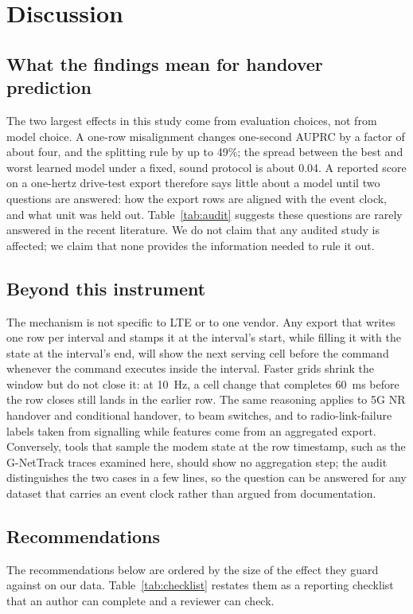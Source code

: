 \documentclass[preprint,review,12pt]{elsarticle}\usepackage{lineno}\linenumbers
\begin{document}
\section{Discussion}
\label{sec:discussion}

\subsection{What the findings mean for handover prediction}
The two largest effects in this study come from evaluation choices, not from model choice. A one-row misalignment changes one-second AUPRC by a factor of about four, and the splitting rule by up to 49\%; the spread between the best and worst learned model under a fixed, sound protocol is about 0.04. A reported score on a one-hertz drive-test export therefore says little about a model until two questions are answered: how the export rows are aligned with the event clock, and what unit was held out. Table~\ref{tab:audit} suggests these questions are rarely answered in the recent literature. We do not claim that any audited study is affected; we claim that none provides the information needed to rule it out.

\subsection{Beyond this instrument}
The mechanism is not specific to LTE or to one vendor. Any export that writes one row per interval and stamps it at the interval's start, while filling it with the state at the interval's end, will show the next serving cell before the command whenever the command executes inside the interval. Faster grids shrink the window but do not close it: at 10~Hz, a cell change that completes 60~ms before the row closes still lands in the earlier row. The same reasoning applies to 5G NR handover and conditional handover, to beam switches, and to radio-link-failure labels taken from signalling while features come from an aggregated export. Conversely, tools that sample the modem state at the row timestamp, such as the G-NetTrack traces examined here, should show no aggregation step; the audit distinguishes the two cases in a few lines, so the question can be answered for any dataset that carries an event clock rather than argued from documentation.

\subsection{Recommendations}
The recommendations below are ordered by the size of the effect they guard against on our data. Table~\ref{tab:checklist} restates them as a reporting checklist that an author can complete and a reviewer can check.
\end{document}
